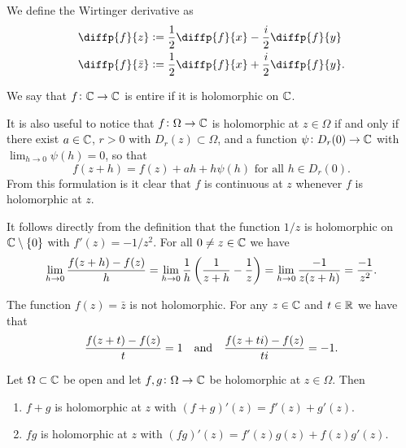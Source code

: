 \documentclass[11pt,a4paper]{article}
\begin{document}
\begin{definition}
  We define the Wirtinger derivative as
  \begin{align*}
    &\diffp{f}{z} :=
    \half \diffp{f}{x} - \frac{i}{2} \diffp{f}{y} \\
    &\diffp{f}{{\bar z}} :=
    \half \diffp{f}{x} + \frac{i}{2} \diffp{f}{y}.
  \end{align*}
\end{definition}

\begin{definition}
  We say that $f \colon \mathbb{C} \to \mathbb{C}$ is entire if it is holomorphic on $\mathbb{C}$.
\end{definition}

\begin{remark}
  It is also useful to notice that $f \colon \Omega \to \mathbb{C}$ is holomorphic
  at $z \in \Omega$ if and only if there exist $a \in \mathbb{C}$, $r > 0$ with
  $D_r(z) \subset \Omega$, and a function $\psi \colon D_r(0) \to \mathbb{C}$ with
  $\lim_{h \to 0} \psi(h) = 0$, so that
  \[
    f(z + h) = f(z) + ah + h \psi(h) \text{ for all } h \in D_r(0).
  \]
  From this formulation is it clear that $f$ is continuous at $z$ whenever
  $f$ is holomorphic at $z$.
\end{remark}

\begin{example}
  It follows directly from the definition that the function $1/z$ is holomorphic
  on $\mathbb{C} \setminus \left\{0\right\}$ with $f'(z) = -1/z^2$. For all $0 \neq z \in \mathbb{C}$
  we have
  \[
    \lim_{h \to 0} \frac{f(z + h) - f(z)}{h} =
    \lim_{h \to 0} \frac{1}{h} \del{\frac{1}{z + h} - \frac{1}{z}} =
    \lim_{h \to 0} \frac{-1}{z (z + h)} =
    \frac{-1}{z^2}.
  \]
\end{example}

\begin{example}
  The function $f(z) = \bar z$ is not holomorphic. For any $z \in \mathbb{C}$ and
  $t \in \mathbb{R}$ we have that
  \[
    \frac{f(z + t) - f(z)}{t} = 1 \quad \text{and} \quad
    \frac{f(z + t i) - f(z)}{t i} = -1.
  \]
\end{example}

\begin{proposition}
  \label{prop:holo-is-linear}
  Let $\Omega \subset \mathbb{C}$ be open and let $f,g \colon \Omega \to \mathbb{C}$ be
  holomorphic at $z \in \Omega$. Then
  \begin{enumerate}
    \item[(1)] $f + g$ is holomorphic at $z$ with $(f + g)'(z) = f'(z) + g'(z)$.
    \item[(2)] $f g$ is holomorphic at $z$ with $(f g)'(z) = 
      f'(z)g(z) + f(z)g'(z)$.
  \end{enumerate}
\end{proposition}
\end{document}
